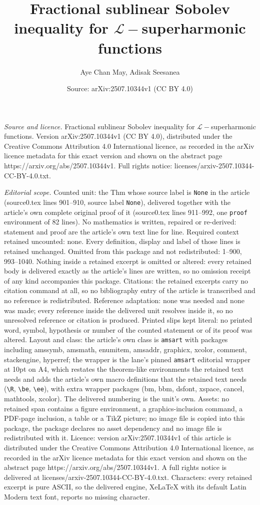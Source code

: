 \documentclass[10pt,a4paper]{amsart}
\title[Fractional sublinear Sobolev inequality for $\mathcal{L}-$su]{Fractional sublinear Sobolev inequality for $\mathcal{L}-$superharmonic functions}
\author{Aye Chan May, Adisak Seesanea}
\date{Source: arXiv:2507.10344v1 (CC BY 4.0)}
\begin{document}
\maketitle

\noindent\emph{Source and licence.} Fractional sublinear Sobolev inequality for $\mathcal{L}-$superharmonic functions. Version arXiv:2507.10344v1 (CC BY 4.0), distributed under the Creative Commons Attribution 4.0 International licence, as recorded in the arXiv licence metadata for this exact version and shown on the abstract page https://arxiv.org/abs/2507.10344v1. Full rights notice: licenses/arxiv-2507.10344-CC-BY-4.0.txt.\par\smallskip

\noindent\textit{Editorial scope.} Counted unit: the Thm whose source label is \texttt{None} in the article (source0.tex lines 901--910, source label \texttt{None}), delivered together with the article's own complete original proof of it (source0.tex lines 911--992, one \texttt{proof} environment of 82 lines). No mathematics is written, repaired or re-derived: statement and proof are the article's own text line for line. Required context retained uncounted: none. Every definition, display and label of those lines is retained unchanged. Omitted from this package and not redistributed: 1--900, 993--1040. Nothing inside a retained excerpt is omitted or altered: every retained body is delivered exactly as the article's lines are written, so no omission receipt of any kind accompanies this package. Citations: the retained excerpts carry no citation command at all, so no bibliography entry of the article is transcribed and no reference is redistributed. Reference adaptation: none was needed and none was made; every reference inside the delivered unit resolves inside it, so no unresolved reference or citation is produced. Printed slips kept literal: no printed word, symbol, hypothesis or number of the counted statement or of its proof was altered. Layout and class: the article's own class is \texttt{amsart} with packages including amssymb, amsmath, enumitem, amsaddr, graphicx, xcolor, comment, stackengine, hyperref; the wrapper is the lane's pinned \texttt{amsart} editorial wrapper at 10pt on A4, which restates the theorem-like environments the retained text needs and adds the article's own macro definitions that the retained text needs (\texttt{\textbackslash R}, \texttt{\textbackslash be}, \texttt{\textbackslash ee}), with extra wrapper packages (bm, bbm, dsfont, xspace, cancel, mathtools, xcolor). The delivered numbering is the unit's own. Assets: no retained span contains a figure environment, a graphics-inclusion command, a PDF-page inclusion, a table or a TikZ picture; no image file is copied into this package, the package declares no asset dependency and no image file is redistributed with it. Licence: version arXiv:2507.10344v1 of this article is distributed under the Creative Commons Attribution 4.0 International licence, as recorded in the arXiv licence metadata for this exact version and shown on the abstract page https://arxiv.org/abs/2507.10344v1. A full rights notice is delivered at licenses/arxiv-2507.10344-CC-BY-4.0.txt. Characters: every retained excerpt is pure ASCII, so the delivered engine, XeLaTeX with its default Latin Modern text font, reports no missing character.
\end{document}
